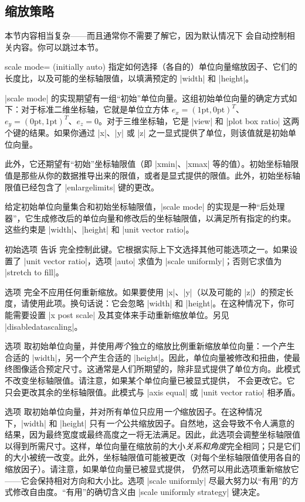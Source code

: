 \subsection{缩放策略}

本节内容相当复杂——而且通常你不需要了解它，因为默认情况下 \PGFPlots{} 会自动控制相关内容。你可以跳过本节。

\begin{pgfplotskey}{scale mode= (initially auto)}
    指定如何选择（各自的）单位向量缩放因子、它们的长度比，以及可能的坐标轴限值，以填满预定的 |width| 和 |height|。

    |scale mode| 的实现期望有一组“初始”单位向量。这组初始单位向量的确定方式如下：对于标准二维坐标轴，它就是单位立方体 $e_x=(1\text{pt},0\text{pt})^T$、$e_y=(0\text{pt},1\text{pt})^T$、$e_z=0$。对于三维坐标轴，它是 |view| 和 |plot box ratio| 这两个键的结果。如果你通过 |x|、|y| 或 |z| 之一显式提供了单位，则该值就是初始单位向量。

    此外，它还期望有“初始”坐标轴限值（即 |xmin|、|xmax| 等的值）。初始坐标轴限值是那些从你的数据推导出来的限值，或者是显式提供的限值。此外，初始坐标轴限值已经包含了 |enlargelimits| 键的更改。

    给定初始单位向量集合和初始坐标轴限值，|scale mode| 的实现是一种“后处理器”，它生成修改后的单位向量和修改后的坐标轴限值，以满足所有指定的约束。这些约束是 |width|、|height| 和 |unit vector ratio|。

    初始选项  告诉 \PGFPlots{} 完全控制此键。它根据实际上下文选择其他可能选项之一。如果设置了 |unit vector ratio|，选项 |auto| 求值为 |scale uniformly|；否则它求值为 |stretch to fill|。

    选项  完全不应用任何重新缩放。如果要使用 |x|、|y|（以及可能的 |z|）的预定长度，请使用此项。换句话说：它会忽略 |width| 和 |height|。在这种情况下，你可能需要设置 |x post scale| 及其变体来手动重新缩放单位。另见 |disabledatascaling|。

    选项  取初始单位向量，并使用\emph{两个}独立的缩放比例重新缩放单位向量：一个产生合适的 |width|，另一个产生合适的 |height|。因此，单位向量被修改和扭曲，使最终图像适合预定尺寸。这通常是人们所期望的，除非显式提供了单位方向。此模式不改变坐标轴限值。请注意，如果某个单位向量已被显式提供，\PGFPlots{} 不会更改它。它只会更改其余的坐标轴限值。此模式与 |axis equal| 或 |unit vector ratio| 相矛盾。

    选项  取初始单位向量，并对所有单位只应用\emph{一个}缩放因子。在这种情况下，|width| 和 |height| 只有\emph{一个}公共缩放因子。自然地，这会导致不令人满意的结果，因为最终宽度或最终高度之一将无法满足。因此，此选项会调整坐标轴限值以得到所需尺寸。这样，单位向量在缩放前的大小\emph{关系和角度}完全相同；只是它们的大小被统一改变。此外，坐标轴限值可能被更改（对每个坐标轴限值使用各自的缩放因子）。请注意，如果单位向量已被显式提供，\PGFPlots{} 仍然可以用此选项重新缩放它——它会保持相对方向和大小比。选项 |scale uniformly| 尽最大努力以“有用”的方式修改自由度。“有用”的确切含义由 |scale uniformly strategy| 键决定。


\end{pgfplotskey}
